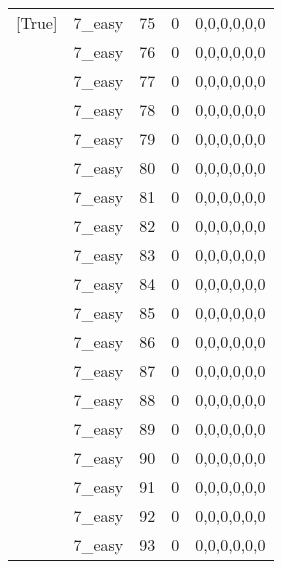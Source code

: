 \begin{tabular}{llrrl}
 [True]          & 7\_easy              &            75 &                     0 & 0,0,0,0,0,0   \\
 [True]          & 7\_easy              &            76 &                     0 & 0,0,0,0,0,0   \\
 [True]          & 7\_easy              &            77 &                     0 & 0,0,0,0,0,0   \\
 [True]          & 7\_easy              &            78 &                     0 & 0,0,0,0,0,0   \\
 [True]          & 7\_easy              &            79 &                     0 & 0,0,0,0,0,0   \\
 [True]          & 7\_easy              &            80 &                     0 & 0,0,0,0,0,0   \\
 [True]          & 7\_easy              &            81 &                     0 & 0,0,0,0,0,0   \\
 [True]          & 7\_easy              &            82 &                     0 & 0,0,0,0,0,0   \\
 [True]          & 7\_easy              &            83 &                     0 & 0,0,0,0,0,0   \\
 [True]          & 7\_easy              &            84 &                     0 & 0,0,0,0,0,0   \\
 [True]          & 7\_easy              &            85 &                     0 & 0,0,0,0,0,0   \\
 [True]          & 7\_easy              &            86 &                     0 & 0,0,0,0,0,0   \\
 [True]          & 7\_easy              &            87 &                     0 & 0,0,0,0,0,0   \\
 [True]          & 7\_easy              &            88 &                     0 & 0,0,0,0,0,0   \\
 [True]          & 7\_easy              &            89 &                     0 & 0,0,0,0,0,0   \\
 [True]          & 7\_easy              &            90 &                     0 & 0,0,0,0,0,0   \\
 [True]          & 7\_easy              &            91 &                     0 & 0,0,0,0,0,0   \\
 [True]          & 7\_easy              &            92 &                     0 & 0,0,0,0,0,0   \\
 [True]          & 7\_easy              &            93 &                     0 & 0,0,0,0,0,0   \\

\end{tabular}
